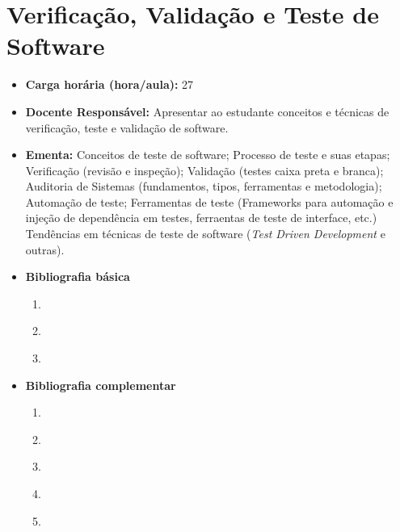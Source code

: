 \documentclass[
	10pt,				%
	openright,			%
	twoside,			%
	a4paper,			%
	english,			%
	french,				%
	brazil,				%
	sumario=tradicional
]{abntex2}
\begin{document}
\section*{Verificação, Validação e Teste de Software}\label{3_testsoft}
\begin{itemize}
	\item \textbf{Carga horária (hora/aula):} 27
	\item \textbf{Docente Responsável:} Apresentar ao estudante conceitos e técnicas de verificação, teste e validação de software.
	\item \textbf{Ementa:} 
	Conceitos de teste de software;
	Processo de teste e suas etapas;
	Verificação (revisão e inspeção);
	Validação (testes caixa preta e branca);
	Auditoria de Sistemas (fundamentos, tipos, ferramentas e metodologia);
	Automação de teste;
	Ferramentas de teste (Frameworks para automação e injeção de dependência em testes, ferraentas de teste de interface, etc.)
	Tendências em técnicas de teste de software (\textit{Test Driven Development} e outras).
	\item \textbf{Bibliografia básica}
	\begin{enumerate}
		\item \cite{pressman2016engenharia}
		\item \cite{cartilha2012}
		\item \cite{goncalves2007}
	\end{enumerate}
	\item \textbf{Bibliografia complementar}
	\begin{enumerate}
		\item \cite{sommerville2011engenharia}
		\item \cite{de2003engenharia}
		\item \cite{deiteldeitel2010}
		\item \cite{deiteldeitel2006}
		\item \cite{minetto2007}
	\end{enumerate} 	
\end{itemize}


\newpage
\end{document}

